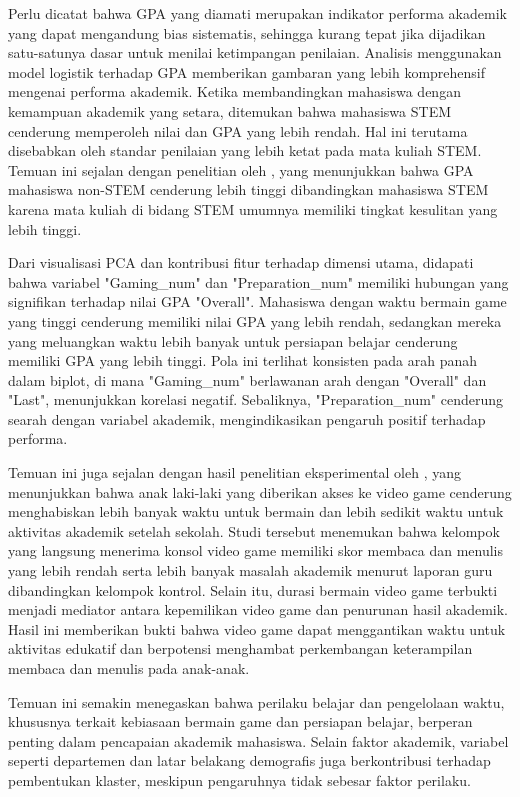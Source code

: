Perlu dicatat bahwa GPA yang diamati merupakan indikator performa akademik yang dapat mengandung bias sistematis, sehingga kurang tepat jika dijadikan satu-satunya dasar untuk menilai ketimpangan penilaian. Analisis menggunakan model logistik terhadap GPA memberikan gambaran yang lebih komprehensif mengenai performa akademik. Ketika membandingkan mahasiswa dengan kemampuan akademik yang setara, ditemukan bahwa mahasiswa STEM cenderung memperoleh nilai dan GPA yang lebih rendah. Hal ini terutama disebabkan oleh standar penilaian yang lebih ketat pada mata kuliah STEM. Temuan ini sejalan dengan penelitian oleh \cite{Tomkin2022}, yang menunjukkan bahwa GPA mahasiswa non-STEM cenderung lebih tinggi dibandingkan mahasiswa STEM karena mata kuliah di bidang STEM umumnya memiliki tingkat kesulitan yang lebih tinggi.

Dari visualisasi PCA dan kontribusi fitur terhadap dimensi utama, didapati bahwa variabel "Gaming\_num" dan "Preparation\_num" memiliki hubungan yang signifikan terhadap nilai GPA "Overall". Mahasiswa dengan waktu bermain game yang tinggi cenderung memiliki nilai GPA yang lebih rendah, sedangkan mereka yang meluangkan waktu lebih banyak untuk persiapan belajar cenderung memiliki GPA yang lebih tinggi. Pola ini terlihat konsisten pada arah panah dalam biplot, di mana "Gaming\_num" berlawanan arah dengan "Overall" dan "Last", menunjukkan korelasi negatif. Sebaliknya, "Preparation\_num" cenderung searah dengan variabel akademik, mengindikasikan pengaruh positif terhadap performa.

Temuan ini juga sejalan dengan hasil penelitian eksperimental oleh \cite{Weis2010}, yang menunjukkan bahwa anak laki-laki yang diberikan akses ke video game cenderung menghabiskan lebih banyak waktu untuk bermain dan lebih sedikit waktu untuk aktivitas akademik setelah sekolah. Studi tersebut menemukan bahwa kelompok yang langsung menerima konsol video game memiliki skor membaca dan menulis yang lebih rendah serta lebih banyak masalah akademik menurut laporan guru dibandingkan kelompok kontrol. Selain itu, durasi bermain video game terbukti menjadi mediator antara kepemilikan video game dan penurunan hasil akademik. Hasil ini memberikan bukti bahwa video game dapat menggantikan waktu untuk aktivitas edukatif dan berpotensi menghambat perkembangan keterampilan membaca dan menulis pada anak-anak.

Temuan ini semakin menegaskan bahwa perilaku belajar dan pengelolaan waktu, khususnya terkait kebiasaan bermain game dan persiapan belajar, berperan penting dalam pencapaian akademik mahasiswa. Selain faktor akademik, variabel seperti departemen dan latar belakang demografis juga berkontribusi terhadap pembentukan klaster, meskipun pengaruhnya tidak sebesar faktor perilaku.

